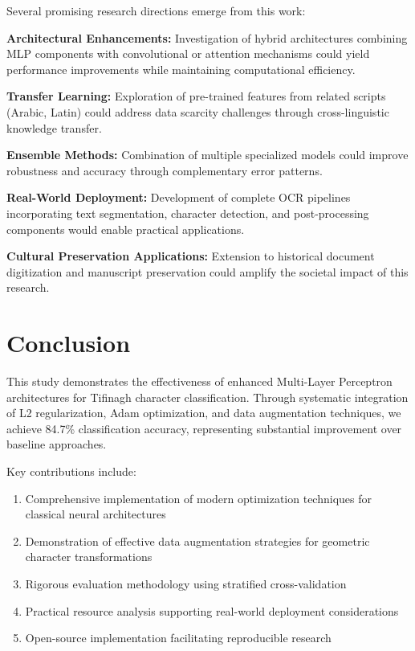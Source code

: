 \documentclass[12pt,a4paper]{article}
\begin{document}
	Several promising research directions emerge from this work:
	
	\textbf{Architectural Enhancements:} Investigation of hybrid architectures combining MLP components with convolutional or attention mechanisms could yield performance improvements while maintaining computational efficiency.
	
	\textbf{Transfer Learning:} Exploration of pre-trained features from related scripts (Arabic, Latin) could address data scarcity challenges through cross-linguistic knowledge transfer.
	
	\textbf{Ensemble Methods:} Combination of multiple specialized models could improve robustness and accuracy through complementary error patterns.
	
	\textbf{Real-World Deployment:} Development of complete OCR pipelines incorporating text segmentation, character detection, and post-processing components would enable practical applications.
	
	\textbf{Cultural Preservation Applications:} Extension to historical document digitization and manuscript preservation could amplify the societal impact of this research.
	
	\section{Conclusion}
	
	This study demonstrates the effectiveness of enhanced Multi-Layer Perceptron architectures for Tifinagh character classification. Through systematic integration of L2 regularization, Adam optimization, and data augmentation techniques, we achieve 84.7\% classification accuracy, representing substantial improvement over baseline approaches.
	
	Key contributions include:
	\begin{enumerate}
		\item Comprehensive implementation of modern optimization techniques for classical neural architectures
		\item Demonstration of effective data augmentation strategies for geometric character transformations
		\item Rigorous evaluation methodology using stratified cross-validation
		\item Practical resource analysis supporting real-world deployment considerations
		\item Open-source implementation facilitating reproducible research
	\end{enumerate}
	
\end{document}
